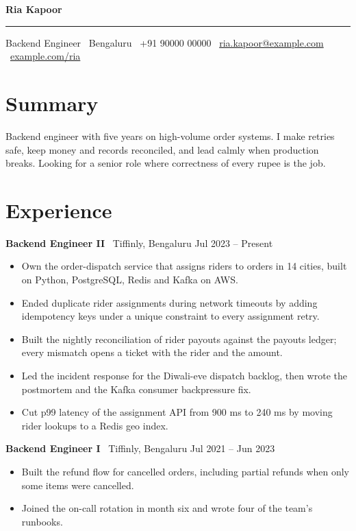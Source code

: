 \documentclass[10pt,a4paper]{article}
\newcommand{\role}[3]{\par\vspace{4pt}\textbf{#1} \textcolor{greytext}{\textbar\ #2} \hfill \textcolor{greytext}{#3}\par\vspace{1pt}}
\begin{document}
{\Huge\bfseries\color{accent}Ria Kapoor}\par\vspace{2pt}
{\color{accent}\rule{\linewidth}{1.5pt}}\par\vspace{3pt}
{\color{greytext}Backend Engineer \textbar\ Bengaluru \textbar\ +91 90000 00000 \textbar\ \href{mailto:ria.kapoor@example.com}{ria.kapoor@example.com} \textbar\ \href{https://example.com/ria}{example.com/ria}}\par

\section{Summary}
Backend engineer with five years on high-volume order systems. I make retries safe, keep money and records reconciled, and lead calmly when production breaks. Looking for a senior role where correctness of every rupee is the job.

\section{Experience}
\role{Backend Engineer II}{Tiffinly, Bengaluru}{Jul 2023 -- Present}
\begin{itemize}
  \item Own the order-dispatch service that assigns riders to orders in 14 cities, built on Python, PostgreSQL, Redis and Kafka on AWS.
  \item Ended duplicate rider assignments during network timeouts by adding idempotency keys under a unique constraint to every assignment retry.
  \item Built the nightly reconciliation of rider payouts against the payouts ledger; every mismatch opens a ticket with the rider and the amount.
  \item Led the incident response for the Diwali-eve dispatch backlog, then wrote the postmortem and the Kafka consumer backpressure fix.
  \item Cut p99 latency of the assignment API from 900 ms to 240 ms by moving rider lookups to a Redis geo index.
\end{itemize}
\role{Backend Engineer I}{Tiffinly, Bengaluru}{Jul 2021 -- Jun 2023}
\begin{itemize}
  \item Built the refund flow for cancelled orders, including partial refunds when only some items were cancelled.
  \item Joined the on-call rotation in month six and wrote four of the team's runbooks.
\end{itemize}
\end{document}
